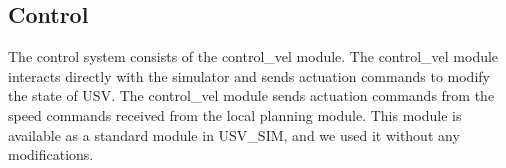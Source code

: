     
    \subsection{Control}
    
        The control system consists of the control\_vel module. The control\_vel module interacts directly with the simulator and sends actuation commands to modify the state of \ac{USV}. The control\_vel module sends actuation commands from the speed commands received from the local planning module. This module is available as a standard module in USV\_SIM, and we used it without any modifications.


    

